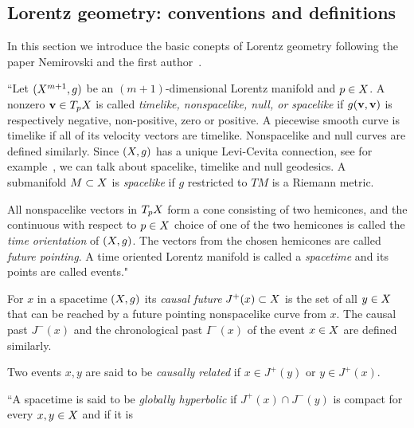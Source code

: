\documentclass[12pt,reqno,a4paper]{amsart}
\begin{document}
    \subsection{Lorentz geometry: conventions and definitions\/}
        In this section we introduce the basic conepts of Lorentz geometry
        following the paper Nemirovski and the first
        author~\cite{ChernovNemirovski}.
        \par\hfill\par
        ``Let $(\ss^{m+1}, g)$ be an $(m+1)$-dimensional Lorentz manifold and
        $p\in \ss$. A nonzero ${\bf v}\in T_p\ss$ is called {\it timelike,
        nonspacelike, null, or spacelike\/} if $g({\bf v}, {\bf v})$ is
        respectively negative, non-positive, zero or positive. A piecewise
        smooth curve is timelike if all of its velocity vectors are timelike.
        Nonspacelike and null curves are defined similarly. Since $(\ss, g)$
        has a unique Levi-Cevita connection, see for
        example~\cite[page 22]{BeemEhrlichEasley}, we can talk about spacelike,
        timelike and null geodesics. A submanifold $M\subset \ss$ is
        {\it spacelike} if $g$ restricted to $TM$ is a Riemann metric.
        \par\hfill\par
        All nonspacelike vectors in $T_p\ss$ form a cone consisting of two
        hemicones, and the continuous with respect to $p\in \ss$ choice of
        one of the two hemicones is called the {\it time orientation\/} of
        $(\ss, g)$. The vectors from the chosen hemicones are called
        \textit{future pointing}.
        A time oriented Lorentz manifold is called a {\it spacetime\/} and
        its points are called events."
        \par\hfill\par
        For $x$ in a spacetime $(\ss, g)$ its {\it causal future\/}
        $J^+(x)\subset \ss$ is the set of all $y\in \ss$ that can be reached
        by a future pointing nonspacelike curve from $x.$ The causal past
        $J^-(x)$ and the chronological past $I^-(x)$ of the event $x\in \ss$
        are defined similarly. %
        \par\hfill\par
        Two events $x,y$ are said to be {\it causally related\/} if
        $x\in J^+(y)$ or $y\in J^+(x).$
        \par\hfill\par
        ``A spacetime is said to be {\it globally hyperbolic\/} if
        $J^+(x)\cap J^-(y)$ is compact for every $x,y\in \ss$ and if it is
\end{document}
